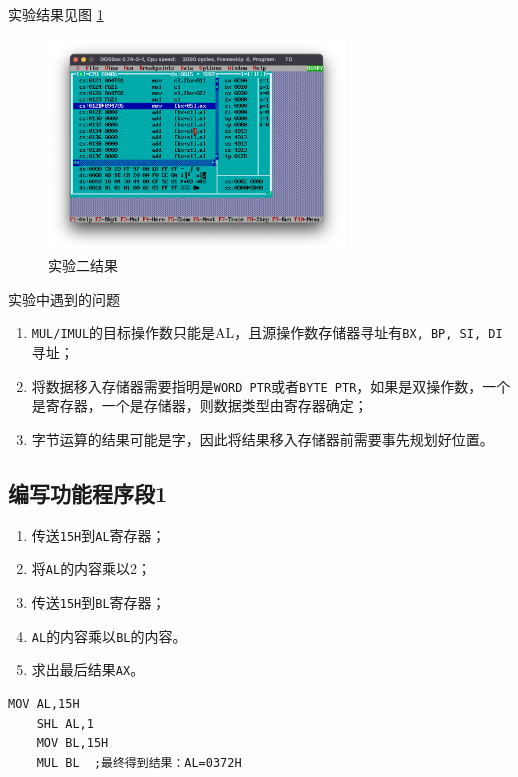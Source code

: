 \documentclass[11pt]{SEU-Digital-Report}
\begin{document}
实验结果见图 \ref{fig:rlt2}
\begin{figure}[htbp]
    \centering
    \includegraphics[width=0.7\textwidth]{fig/rlt2.png}
    \caption{实验二结果}
    \label{fig:rlt2} 
\end{figure}

\begin{note}{实验中遇到的问题}{}
    \begin{enumerate}
        \item \texttt{MUL/IMUL}的目标操作数只能是AL，且源操作数存储器寻址有\texttt{BX, BP, SI, DI}寻址；
        \item 将数据移入存储器需要指明是\texttt{WORD PTR}或者\texttt{BYTE PTR}，如果是双操作数，一个是寄存器，一个是存储器，则数据类型由寄存器确定；
        \item 字节运算的结果可能是字，因此将结果移入存储器前需要事先规划好位置。
    \end{enumerate}
\end{note}

\subsection{编写功能程序段1}
\begin{enumerate}
    \item 传送\texttt{15H}到\texttt{AL}寄存器；
    \item 将\texttt{AL}的内容乘以2；
    \item 传送\texttt{15H}到\texttt{BL}寄存器；
    \item \texttt{AL}的内容乘以\texttt{BL}的内容。
    \item 求出最后结果\texttt{AX}。
\end{enumerate}

\begin{lstlisting}[language={[x86masm]Assembler},title=code]
    MOV AL,15H
    SHL AL,1
    MOV BL,15H
    MUL BL  ;最终得到结果：AL=0372H
\end{lstlisting}
\end{document}
